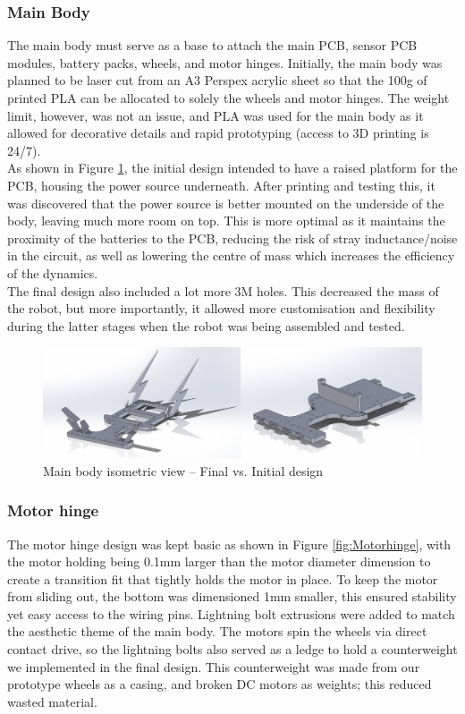 \subsubsection{Main Body}
The main body must serve as a base to attach the main PCB, sensor PCB modules, battery packs, wheels, and motor hinges. Initially, the main body was planned to be laser cut from an A3 Perspex acrylic sheet so that the 100g of printed PLA can be allocated to solely the wheels and motor hinges. The weight limit, however, was not an issue, and PLA was used for the main body as it allowed for decorative details and rapid prototyping (access to 3D printing is 24/7).  
\\

As shown in Figure \ref{fig:MainBod}, the initial design intended to have a raised platform for the PCB, housing the power source underneath. After printing and testing this, it was discovered that the power source is better mounted on the underside of the body, leaving much more room on top. This is more optimal as it maintains the proximity of the batteries to the PCB, reducing the risk of stray inductance/noise in the circuit, as well as lowering the centre of mass which increases the efficiency of the dynamics. 
\\

The final design also included a lot more 3M holes. This decreased the mass of the robot, but more importantly, it allowed more customisation and flexibility during the latter stages when the robot was being assembled and tested.  

\begin{figure}[H]
    \centering
    \includegraphics[width=0.7\linewidth]{REPORT/MainBod.png}
    \caption{Main body isometric view – Final vs. Initial design}
    \label{fig:MainBod}
\end{figure}

\subsubsection{Motor hinge}
The motor hinge design was kept basic as shown in Figure \ref{fig:Motorhinge}, with the motor holding being 0.1mm larger than the motor diameter dimension to create a transition fit that tightly holds the motor in place. To keep the motor from sliding out, the bottom was dimensioned 1mm smaller, this ensured stability yet easy access to the wiring pins. Lightning bolt extrusions were added to match the aesthetic theme of the main body. The motors spin the wheels via direct contact drive, so the lightning bolts also served as a ledge to hold a counterweight we implemented in the final design. This counterweight was made from our prototype wheels as a casing, and broken DC motors as weights; this reduced wasted material. 

